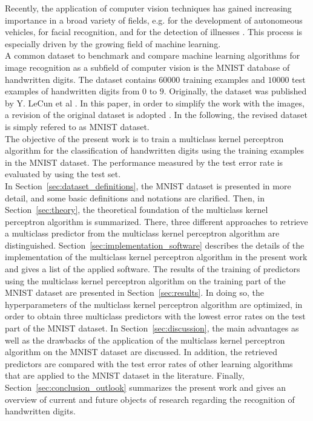 Recently, the application of computer vision techniques has gained increasing importance in a broad variety of fields, e.g. for the development of autonomeous vehicles, for facial recognition, and for the detection of illnesses \cite{autonomeous2020, emotion2020, medicine2021}. This process is especially driven by the growing field of machine learning. \\

A common dataset to benchmark and compare machine learning algorithms for image recognition as a subfield of computer vision is the MNIST database of handwritten digits. The dataset contains $60000$ training examples and $10000$ test examples of handwritten digits from $0$ to $9$. Originally, the dataset was published by Y. LeCun et al \cite{MNIST}. In this paper, in order to simplify the work with the images, a revision of the original dataset is adopted \cite{KaggleData}. In the following, the revised dataset is simply refered to as MNIST dataset. \\

The objective of the present work is to train a multiclass kernel perceptron algorithm for the classification of handwritten digits using the training examples in the MNIST dataset. The performance measured by the test error rate is evaluated by using the test set.\\

In Section~\ref{sec:dataset_definitions}, the MNIST dataset is presented in more detail, and some basic definitions and notations are clarified. Then, in Section~\ref{sec:theory}, the theoretical foundation of the multiclass kernel perceptron algorithm is summarized. There, three different approaches to retrieve a multiclass predictor from the multiclass kernel perceptron algorithm are distinguished. Section~\ref{sec:implementation_software} describes the details of the implementation of the multiclass kernel perceptron algorithm in the present work and gives a list of the applied software. The results of the training of predictors using the multiclass kernel perceptron algorithm on the training part of the MNIST dataset are presented in Section~\ref{sec:results}. In doing so, the hyperparameters of the multiclass kernel perceptron algorithm are optimized, in order to obtain three multiclass predictors with the lowest error rates on the test part of the MNIST dataset. In Section~\ref{sec:discussion}, the main advantages as well as the drawbacks of the application of the multiclass kernel perceptron algorithm on the MNIST dataset are discussed. In addition, the retrieved predictors are compared with the test error rates of other learning algorithms that are applied to the MNIST dataset in the literature. Finally, Section~\ref{sec:conclusion_outlook} summarizes the present work and gives an overview of current and future objects of research regarding the recognition of handwritten digits.